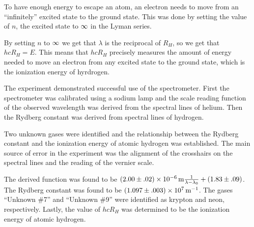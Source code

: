 \begin{paper}
To have enough energy to escape an atom, an electron needs to move from an ``infinitely'' excited state to the ground state.
This was done by setting the value of $n$, the excited state to $\infty$ in the Lyman series.


By setting $n$ to $\infty$ we get that $\lambda$ is the reciprocal of $R_H$, so we get that $hcR_H=E$.
This means that $hcR_H$ precisely measures the amount of energy needed to move an electron from any excited state to the ground state, which is the ionization energy of hyrdrogen.


The experiment demonstrated successful use of the spectrometer.
First the spectrometer was calibrated using a sodium lamp and the scale reading function of the observed wavelength was derived from the spectral lines of helium.
Then the Rydberg constant was derived from spectral lines of hydrogen.

Two unknown gases were identified and the relationship between the Rydberg constant and the ionization energy of atomic hydrogen was established.
The main source of error in the experiment was the alignment of the crosshairs on the spectral lines and the reading of the vernier scale.

The derived function was found to be $(2.00\pm.02)\times\SI{E-6}{\meter}\frac{1}{\lambda-\lambda_0}+(1.83\pm.09)$.
The Rydberg constant was found to be $(1.097\pm.003)\times\SI{E7}{\per\meter}$.
The gases ``Unknown \#7'' and ``Unknown \#9'' were identified as krypton and neon, respectively.
Lastly, the value of $hcR_H$ was determined to be the ionization energy of atomic hydrogen.


\end{paper}
